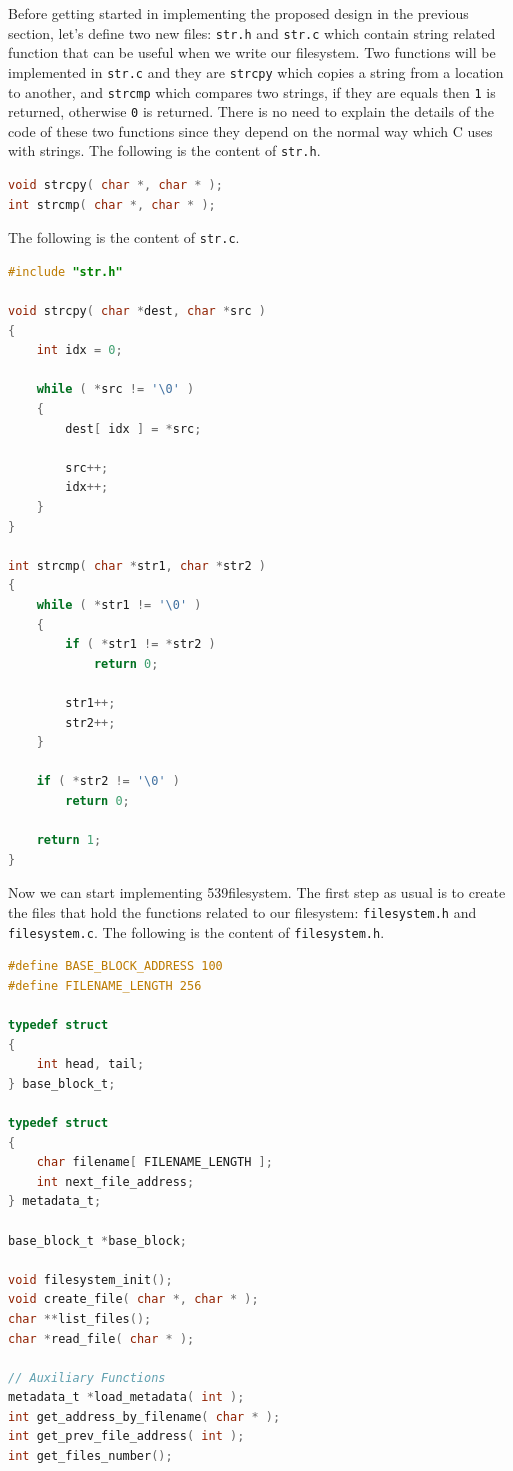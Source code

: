 Before getting started in implementing the proposed design in the
previous section, let's define two new files: \lstinline!str.h! and
\lstinline!str.c! which contain string related function that can be
useful when we write our filesystem. Two functions will be implemented
in \lstinline!str.c! and they are \lstinline!strcpy! which copies a
string from a location to another, and \lstinline!strcmp! which compares
two strings, if they are equals then \lstinline!1! is returned,
otherwise \lstinline!0! is returned. There is no need to explain the
details of the code of these two functions since they depend on the
normal way which C uses with strings. The following is the content of
\lstinline!str.h!.

\begin{lstlisting}[language=C]
void strcpy( char *, char * );
int strcmp( char *, char * );
\end{lstlisting}

The following is the content of \lstinline!str.c!.

\begin{lstlisting}[language=C]
#include "str.h"

void strcpy( char *dest, char *src )
{
    int idx = 0;
    
    while ( *src != '\0' )
    {
        dest[ idx ] = *src;
        
        src++;
        idx++;
    }
}

int strcmp( char *str1, char *str2 )
{
    while ( *str1 != '\0' )
    {
        if ( *str1 != *str2 )
            return 0;
        
        str1++;
        str2++;
    }
    
    if ( *str2 != '\0' )
        return 0;
    
    return 1;
}
\end{lstlisting}

Now we can start implementing 539filesystem. The first step as usual is
to create the files that hold the functions related to our filesystem:
\lstinline!filesystem.h! and \lstinline!filesystem.c!. The following is
the content of \lstinline!filesystem.h!.

\begin{lstlisting}[language=C]
#define BASE_BLOCK_ADDRESS 100
#define FILENAME_LENGTH 256

typedef struct
{
    int head, tail;
} base_block_t;

typedef struct
{
    char filename[ FILENAME_LENGTH ];
    int next_file_address;
} metadata_t;

base_block_t *base_block;

void filesystem_init();
void create_file( char *, char * );
char **list_files();
char *read_file( char * );

// Auxiliary Functions
metadata_t *load_metadata( int );
int get_address_by_filename( char * );
int get_prev_file_address( int );
int get_files_number();
\end{lstlisting}

